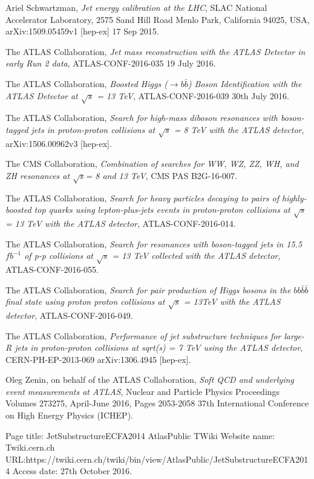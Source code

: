 \documentclass[UKenglish,texlive=2013]{\ATLASLATEXPATH atlasdoc}
\newcommand{\cme}{\sqrt{s}}
\begin{document}
\begin{thebibliography}{9}
Ariel Schwartzman,
\emph{Jet energy calibration at the LHC},
SLAC National Accelerator Laboratory, 2575 Sand Hill Road
Menlo Park, California 94025, USA,
arXiv:1509.05459v1 [hep-ex] 17 Sep 2015.

The ATLAS Collaboration,
\emph{Jet mass reconstruction with the ATLAS Detector in early Run 2 data},
ATLAS-CONF-2016-035
19 July 2016.

The ATLAS Collaboration,
\emph{Boosted Higgs ($\to b\bar{b}$) Boson Identification with the ATLAS
Detector at $\cme$ = 13 TeV},
ATLAS-CONF-2016-039
30th July 2016.

The ATLAS Collaboration,
\emph{Search for high-mass diboson resonances with boson-tagged jets in proton-proton collisions at $\cme$ = 8 TeV with the ATLAS detector},
arXiv:1506.00962v3 [hep-ex].

The CMS Collaboration,
\emph{Combination of searches for WW, WZ, ZZ, WH, and ZH
resonances at $\cme$= 8 and 13 TeV},
CMS PAS B2G-16-007.

The ATLAS Collaboration,
\emph{Search for heavy particles decaying to pairs of highly-boosted top
quarks using lepton-plus-jets events in proton-proton collisions at
$\cme$ = 13 TeV with the ATLAS detector},
ATLAS-CONF-2016-014.

The ATLAS Collaboration,
\emph{Search for resonances with boson-tagged jets in 15.5 $fb^{-1}$ of p-p
collisions at $\cme$ = 13 TeV collected with the ATLAS detector},
ATLAS-CONF-2016-055.

The ATLAS Collaboration,
\emph{Search for pair production of Higgs bosons in the $bb\bar{b}\bar{b}$ final state
using proton proton collisions at $\cme$ = 13TeV with the ATLAS detector},
ATLAS-CONF-2016-049.

The ATLAS Collaboration,
\emph{Performance of jet substructure techniques for large-R jets in proton-proton collisions at sqrt(s) = 7 TeV using the ATLAS detector},
CERN-PH-EP-2013-069
arXiv:1306.4945 [hep-ex].

Oleg Zenin, on behalf of the ATLAS Collaboration,
\emph{Soft QCD and underlying event measurements at ATLAS},
Nuclear and Particle Physics Proceedings
Volumes 273275, April-June 2016, Pages 2053-2058
37th International Conference on High Energy Physics (ICHEP).

Page title: JetSubstructureECFA2014 AtlasPublic TWiki
Website name: Twiki.cern.ch
URL:https://twiki.cern.ch/twiki/bin/view/AtlasPublic/JetSubstructureECFA2014
Access date: 27th October 2016.


\end{thebibliography}
\end{document}
